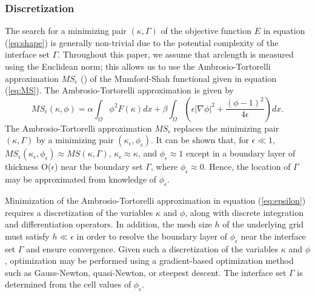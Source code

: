 \documentclass[manuscript,revised]{geophysics}
\begin{document}
\subsubsection{Discretization}
The search for a minimizing pair $(\kappa,\Gamma)$ of the objective function $E$ in equation (\ref{eq:shape}) is generally non-trivial due to the potential complexity of the interface set $\Gamma$.  Throughout this paper, we assume that arclength is measured using the Euclidean norm; this allows us to use the Ambrosio-Tortorelli approximation $MS_\epsilon$ (\cite{Ambrosio_1992}) of the Mumford-Shah functional given in equation (\ref{eq:MS}).  The Ambrosio-Tortorelli approximation is given by %
\begin{equation} \label{eq:epsilon}
MS_\epsilon (\kappa,\phi)=\alpha \int_\Omega \phi^2 F(\kappa) dx + \beta \int_\Omega  \left( \epsilon \left\vert \nabla \phi \right\vert^2+\frac{(\phi-1)^2}{4\epsilon} \right)   dx.	
\end{equation}
The Ambrosio-Tortorelli approximation $MS_\epsilon$ replaces the minimizing pair $(\kappa,\Gamma)$ by a minimizing pair $(\kappa_\epsilon,\phi_\epsilon)$.  It can be shown that, for $\epsilon \ll 1$,  $ MS_\epsilon (\kappa_\epsilon,\phi_\epsilon ) \approx MS(\kappa,\Gamma)$, $\kappa_\epsilon \approx \kappa$, and $\phi_\epsilon \approx 1$ except in a boundary layer of thickness O($\epsilon$)  near the boundary set $\Gamma$, where $\phi_\epsilon \approx 0$.  Hence, the location of $\Gamma$ may be approximated from knowledge of $\phi_\epsilon$.  

Minimization of the Ambrosio-Tortorelli approximation in equation (\ref{eq:epsilon}) requires a discretization of the variables $\kappa$ and $\phi$, along with discrete integration and differentiation operators.  In addition, the mesh size $h$ of the underlying grid must satisfy $h\ll\epsilon$ in order to resolve the boundary layer of $\phi_\epsilon$ near the interface set $\Gamma$ and ensure convergence.  Given such a discretization of the variables $\kappa$ and $\phi$, optimization may be performed using a gradient-based optimization method such as Gauss-Newton, quasi-Newton, or steepest descent.  The interface set $\Gamma$ is determined from the cell values of $\phi_\epsilon$.
\end{document}
